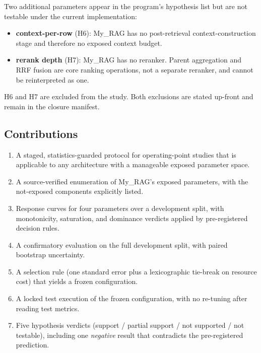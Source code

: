 \documentclass[11pt,a4paper]{article}
\begin{document}
Two additional parameters appear in the program's hypothesis list but
are not testable under the current implementation:

\begin{itemize}[leftmargin=1.5em,itemsep=0.15em]
  \item \textbf{context-per-row} (H6): My\_RAG has no
    post-retrieval context-construction stage and therefore no
    exposed context budget.
  \item \textbf{rerank depth} (H7): My\_RAG has no reranker.
    Parent aggregation and RRF fusion are core ranking operations,
    not a separate reranker, and cannot be reinterpreted as one.
\end{itemize}

H6 and H7 are excluded from the study. Both exclusions are stated
up-front and remain in the closure manifest.

\subsection{Contributions}
\begin{enumerate}[leftmargin=1.5em,itemsep=0.15em]
  \item A staged, statistics-guarded protocol for operating-point
    studies that is applicable to any architecture with a
    manageable exposed parameter space.
  \item A source-verified enumeration of My\_RAG's exposed
    parameters, with the not-exposed components explicitly listed.
  \item Response curves for four parameters over a development
    split, with monotonicity, saturation, and dominance verdicts
    applied by pre-registered decision rules.
  \item A confirmatory evaluation on the full development split,
    with paired bootstrap uncertainty.
  \item A selection rule (one standard error plus a lexicographic
    tie-break on resource cost) that yields a frozen configuration.
  \item A locked test execution of the frozen configuration, with
    no re-tuning after reading test metrics.
  \item Five hypothesis verdicts (support / partial support /
    not supported / not testable), including one \emph{negative}
    result that contradicts the pre-registered prediction.
\end{enumerate}

\end{document}
